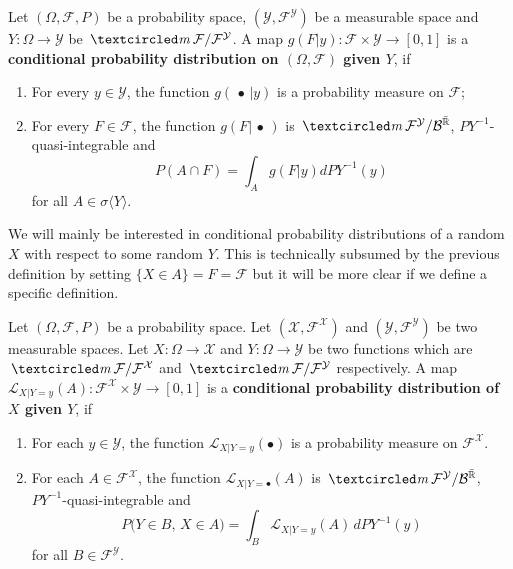 \begin{definition}
\label{df: cpd}
Let $(\Omega, \mathcal F, P)$ be a probability space,  $(\mathcal Y, \mathcal F^{\mathcal Y})$ be a measurable space and $Y\colon \Omega \rightarrow \mathcal Y$ be $\mcirc \mathcal F/\mathcal F^{\mathcal Y}$.
A map $g(F|y)\colon \mathcal F\times \mathcal Y \rightarrow [0,1]$ is a {\bf conditional probability distribution on $(\Omega, \mathcal F)$ given $Y$}, if
\begin{enumerate}
\item\label{item one for cpd} For  every $y\in \mathcal Y$, the function  $g(\,\bullet\,| y )$ is a probability measure on $\mathcal F$;
\item \label{item two for cpd} For every $F\in\mathcal F$, the function $g(F|\,\bullet\, )$ is $\mcirc\mathcal F^{\mathcal Y}/\mathcal B^{\bar{\Bbb R}}$, $PY^{-1}$-quasi-integrable and
\[P( A\cap F) = \int_A g(F|y) dPY^{-1}(y) \]
for all $A\in \sigma\langle Y\rangle$.
\end{enumerate}
\end{definition}

We will mainly be interested in conditional probability distributions of a random $X$ with respect to some random $Y$. This is technically subsumed by the previous definition by setting $\{X \in A \} = F = \mathcal  F$ but it will be more clear if we define a specific definition.

\begin{definition}[{\bf Conditional probability distribution of $X$ given $Y=y$}]
Let $(\Omega, \mathcal F, P)$ be a probability space. Let $(\mathcal X, \mathcal F^{\mathcal X})$ and $(\mathcal Y, \mathcal F^{\mathcal Y})$ be two measurable spaces. Let $X\colon \Omega \rightarrow\mathcal X$ and $Y\colon \Omega\rightarrow \mathcal Y$ be two functions which are $\mcirc \mathcal F/\mathcal F^{\mathcal X}$ and $\mcirc \mathcal F/\mathcal F^{\mathcal Y}$ respectively.
A map $\mathcal L_{X|Y=y}(A)\colon  \mathcal F^{\mathcal X} \times \mathcal Y \rightarrow [0,1]$ is a {\bf conditional probability distribution of $X$ given $Y$}, if
\begin{enumerate}
\item For each $y\in\mathcal Y$, the function $\mathcal L_{X|Y=y}(\bullet)$ is a probability measure on $\mathcal F^{\mathcal X} $.
\item For each $A \in \mathcal F^{\mathcal X}$, the function $\mathcal L_{X|Y=\bullet}(A)$ is $\mcirc \mathcal F^{\mathcal Y}/\mathcal B^{\bar{\Bbb R}}$, $PY^{-1}$-quasi-integrable and
\[ P\bigl( Y\in B ,\, X\in A\bigr) = \int_B \mathcal L_{X|Y=y}(A) \,dPY^{-1}(y) \]
for all $B\in \mathcal F^{\mathcal Y}$.
\end{enumerate}
\end{definition}


